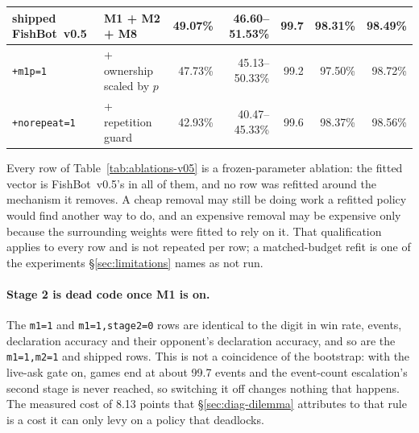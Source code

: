 \documentclass[11pt]{article}
\theoremstyle{definition}
\DeclareRobustCommand{\vfive}{\texorpdfstring{\mbox{FishBot v0.5}}{FishBot v0.5}}
\providecommand{\numStageTwoCost}{8.13}
\providecommand{\numAblFull}{49.07}
\providecommand{\numAblFullCI}{46.60--51.53}
\providecommand{\numAblFullDeclAcc}{98.31}
\providecommand{\numAblFullEvents}{99.7}
\providecommand{\numAblFullOppDeclAcc}{98.49}
\providecommand{\numAblOwnershipP}{47.73}
\providecommand{\numAblOwnershipPCI}{45.13--50.33}
\providecommand{\numAblOwnershipPDeclAcc}{97.50}
\providecommand{\numAblOwnershipPEvents}{99.2}
\providecommand{\numAblOwnershipPOppDeclAcc}{98.72}
\providecommand{\numAblRepeatGuard}{42.93}
\providecommand{\numAblRepeatGuardCI}{40.47--45.33}
\providecommand{\numAblRepeatGuardDeclAcc}{98.37}
\providecommand{\numAblRepeatGuardEvents}{99.6}
\providecommand{\numAblRepeatGuardOppDeclAcc}{98.56}
\begin{document}
\begin{table}[t]
\begin{tabular}{llrrrrr}
shipped \vfive{}            & M1 + M2 + M8     & \numAblFull\%       & \numAblFullCI\%       & \numAblFullEvents{}       & \numAblFullDeclAcc\%       & \numAblFullOppDeclAcc\% \\
\midrule
\texttt{+m1p=1}             & \quad + ownership scaled by $p$ & \numAblOwnershipP\%  & \numAblOwnershipPCI\%  & \numAblOwnershipPEvents{}  & \numAblOwnershipPDeclAcc\%  & \numAblOwnershipPOppDeclAcc\% \\
\texttt{+norepeat=1}        & \quad + repetition guard        & \numAblRepeatGuard\% & \numAblRepeatGuardCI\% & \numAblRepeatGuardEvents{} & \numAblRepeatGuardDeclAcc\% & \numAblRepeatGuardOppDeclAcc\% \\
\bottomrule
\end{tabular}
\end{table}

Every row of Table~\ref{tab:ablations-v05} is a frozen-parameter ablation: the
fitted vector is \vfive{}'s in all of them, and no row was refitted around the
mechanism it removes. A cheap removal may still be doing work a refitted policy
would find another way to do, and an expensive removal may be expensive only
because the surrounding weights were fitted to rely on it. That qualification
applies to every row and is not repeated per row; a matched-budget refit is one of
the experiments \S\ref{sec:limitations} names as not run.

\paragraph{Stage 2 is dead code once M1 is on.} The \texttt{m1=1} and
\texttt{m1=1,stage2=0} rows are identical to the digit in win rate, events,
declaration accuracy and their opponent's declaration accuracy, and so are the
\texttt{m1=1,m2=1} and shipped rows. This is not a coincidence of the bootstrap:
with the live-ask gate on, games end at about \numAblFullEvents{} events and the
event-count escalation's second stage is never reached, so switching it off
changes nothing that happens. The measured cost of \numStageTwoCost{} points that
\S\ref{sec:diag-dilemma} attributes to that rule is a cost it can only levy on a
policy that deadlocks.
\end{document}
